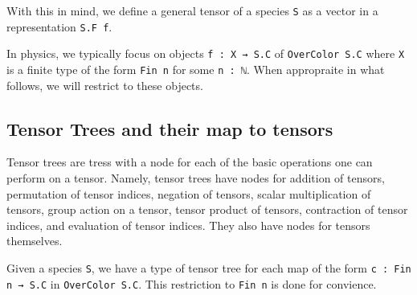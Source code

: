 \documentclass[a4paper, 11pt]{article}
\begin{document}
With this in mind, we define a general tensor of a species \lstinline|S| as a vector in a representation 
\lstinline|S.F f|. 

In physics, we typically focus on objects \lstinline|f : X → S.C| of \lstinline|OverColor S.C|  where \lstinline|X| is a 
finite type of the form \lstinline|Fin n| for some \lstinline|n : ℕ|. When appropraite in what follows, 
we will restrict to these objects.

\subsection{Tensor Trees and their map to tensors}

Tensor trees are tress with a node for each of the basic operations one can perform on a tensor. 
Namely, tensor trees have nodes for addition of tensors, permutation of tensor indices, negation of tensors, 
  scalar multiplication of tensors, group action on a tensor, tensor product of tensors, contraction of tensor indices,
  and evaluation of tensor indices.
They also have nodes for tensors themselves.

Given a species \lstinline|S|, we have a type of tensor tree for each map of the form
\lstinline|c : Fin n → S.C| in \lstinline|OverColor S.C|. 
This restriction to \lstinline|Fin n| is done for convience.
\end{document}
